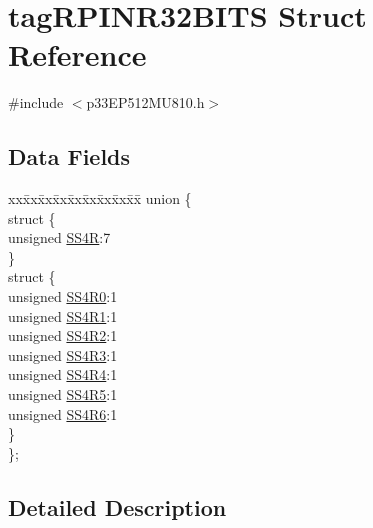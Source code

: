 \hypertarget{structtag_r_p_i_n_r32_b_i_t_s}{}\section{tag\+R\+P\+I\+N\+R32\+B\+I\+TS Struct Reference}
\label{structtag_r_p_i_n_r32_b_i_t_s}


{\ttfamily \#include $<$p33\+E\+P512\+M\+U810.\+h$>$}

\subsection*{Data Fields}
\begin{DoxyCompactItemize}
\item 
\begin{tabbing}
xx\=xx\=xx\=xx\=xx\=xx\=xx\=xx\=xx\=\kill
union \{\\
\>struct \{\\
\>\>unsigned \hyperlink{structtag_r_p_i_n_r32_b_i_t_s_afb5d3ceb5d3f34da13108ea46c202090}{SS4R}:7\\
\>\} \\
\>struct \{\\
\>\>unsigned \hyperlink{structtag_r_p_i_n_r32_b_i_t_s_a88eafbfb465788859722d012994d6ec5}{SS4R0}:1\\
\>\>unsigned \hyperlink{structtag_r_p_i_n_r32_b_i_t_s_a32def3266d9b12794beaded25386d0d2}{SS4R1}:1\\
\>\>unsigned \hyperlink{structtag_r_p_i_n_r32_b_i_t_s_a2f0c4911cf22e385924b6a60be3a3142}{SS4R2}:1\\
\>\>unsigned \hyperlink{structtag_r_p_i_n_r32_b_i_t_s_aa7abbf1d7ccae9c556bcbe18aefe72de}{SS4R3}:1\\
\>\>unsigned \hyperlink{structtag_r_p_i_n_r32_b_i_t_s_af72b9d53e83788c41da3bf6a4910e7cd}{SS4R4}:1\\
\>\>unsigned \hyperlink{structtag_r_p_i_n_r32_b_i_t_s_ab59b506d3bc96fb45a607a8a4c49a059}{SS4R5}:1\\
\>\>unsigned \hyperlink{structtag_r_p_i_n_r32_b_i_t_s_a0921e6a113f9eaf676ee2395465d629a}{SS4R6}:1\\
\>\} \\
\}; \\

\end{tabbing}\end{DoxyCompactItemize}


\subsection{Detailed Description}


